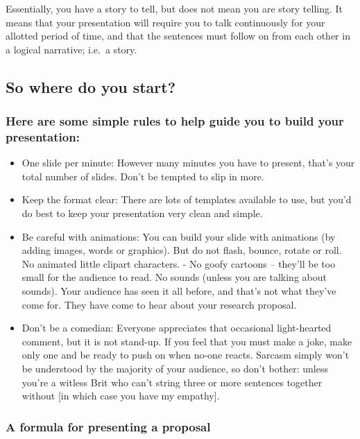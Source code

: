 \documentclass[
]{krantz}
\providecommand{\tightlist}{%
  \setlength{\itemsep}{0pt}\setlength{\parskip}{0pt}}
\begin{document}
Essentially, you have a story to tell, but does not mean you are story telling. It means that your presentation will require you to talk continuously for your allotted period of time, and that the sentences must follow on from each other in a logical narrative; i.e.~a story.

\hypertarget{so-where-do-you-start}{%
\subsection{So where do you start?}\label{so-where-do-you-start}}

\hypertarget{here-are-some-simple-rules-to-help-guide-you-to-build-your-presentation}{%
\subsubsection{Here are some simple rules to help guide you to build your presentation:}\label{here-are-some-simple-rules-to-help-guide-you-to-build-your-presentation}}

\begin{itemize}
\tightlist
\item
  One slide per minute: However many minutes you have to present, that's your total number of slides. Don't be tempted to slip in more.
\item
  Keep the format clear: There are lots of templates available to use, but you'd do best to keep your presentation very clean and simple.
\item
  Be careful with animations: You can build your slide with animations (by adding images, words or graphics). But do not flash, bounce, rotate or roll. No animated little clipart characters. - No goofy cartoons -- they'll be too small for the audience to read. No sounds (unless you are talking about sounds). Your audience has seen it all before, and that's not what they've come for. They have come to hear about your research proposal.
\item
  Don't be a comedian: Everyone appreciates that occasional light-hearted comment, but it is not stand-up. If you feel that you must make a joke, make only one and be ready to push on when no-one reacts. Sarcasm simply won't be understood by the majority of your audience, so don't bother: unless you're a witless Brit who can't string three or more sentences together without {[}in which case you have my empathy{]}.
\end{itemize}

\hypertarget{a-formula-for-presenting-a-proposal}{%
\subsubsection{A formula for presenting a proposal}\label{a-formula-for-presenting-a-proposal}}
\end{document}
